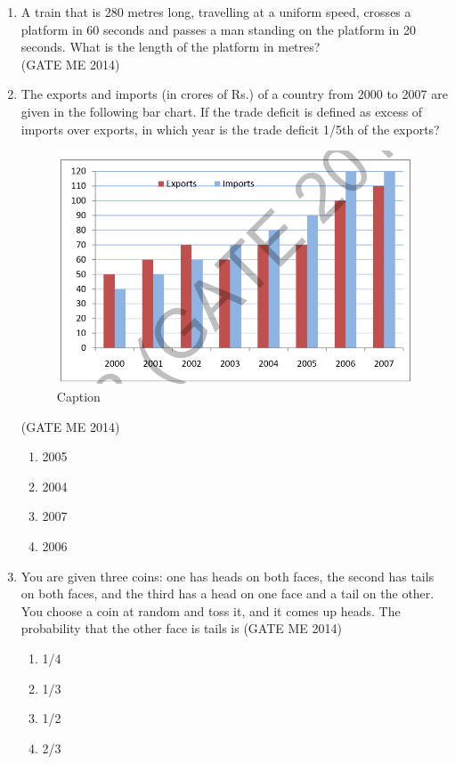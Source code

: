 \documentclass[journal]{IEEEtran}
\numberwithin{equation}{enumi}
\numberwithin{figure}{enumi}
\begin{document}
\begin{enumerate}
\item A train that is 280 metres long, travelling at a uniform speed, crosses a platform in 60 seconds and passes a man standing on the platform in 20 seconds. What is the length of the platform in metres?\\
\hfill{(GATE ME 2014)}

\item 
The exports and imports (in crores of Rs.) of a country from 2000 to 2007 are given in the following bar chart. If the trade deficit is defined as excess of imports over exports, in which year is the trade deficit 1/5th of the exports?
\begin{figure}
    \centering
    \includegraphics[width=0.7\columnwidth]{figs/fig2.1.png}
    \caption{Caption}
    \label{fig:2.1}
\end{figure}
\hfill{(GATE ME 2014)}
\begin{multicols}{4}
    \begin{enumerate}
        \item 2005
        \item 2004
        \item 2007
        \item 2006
    \end{enumerate}
\end{multicols}
\item You are given three coins: one has heads on both faces, the second has tails on both faces, and the third has a head on one face and a tail on the other. You choose a coin at random and toss it, and it comes up heads. The probability that the other face is tails is
\hfill{(GATE ME 2014)}
\begin{multicols}{4}
    \begin{enumerate}
        \item 1/4
        \item 1/3
        \item 1/2
        \item 2/3
    \end{enumerate}
\end{multicols}
\end{enumerate}
\end{document}

